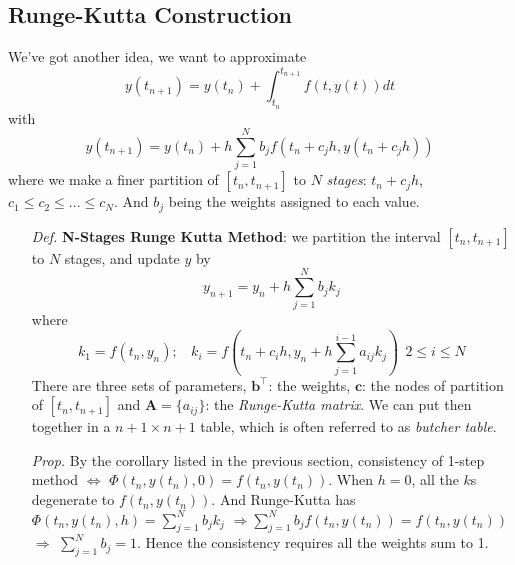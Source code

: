 \documentclass[a4paper, 11pt]{article}
\begin{document}
\subsection{Runge-Kutta Construction}
We've got another idea, we want to approximate
$$
y(t_{n+1}) = y(t_n) + \int_{t_n}^{t_{n+1}} f(t, y(t)) dt
$$
with 
$$
y(t_{n+1}) = y(t_n) + h \sum_{j=1}^N b_j f(t_n + c_jh, y(t_n + c_j h))
$$
where we make a finer partition of $[t_n, t_{n+1}]$ to $N$ \emph{stages}: $t_n + c_j h$, $c_1 \leq c_2 \leq ... \leq c_N$. And $b_j$ being the weights assigned to each value.
\begin{itemize}
	\item[\textit{Def.}] \textbf{N-Stages Runge Kutta Method}: we partition the interval $[t_n, t_{n+1}]$ to $N$ stages, and update $y$ by
	$$
	y_{n+1} = y_n + h\sum_{j=1}^N b_j k_j
	$$
	where
	$$
	k_1 = f(t_n, y_n);~~~~k_i=f(t_n+c_ih, y_n + h\sum_{j=1}^{i-1} a_{ij}k_j)~~2\leq i \leq N
	$$
	There are three sets of parameters, $\bm{b}^{\top}$: the weights, $\bm{c}$: the nodes of partition of $[t_n, t_{n+1}]$ and $\bm{A}=\{a_{ij}\}$: the \emph{Runge-Kutta matrix}. We can put then together in a $n+1 \times n+1$ table, which is often referred to as \emph{butcher table}.
		

	\item[\textit{Prop.}] By the corollary listed in the previous section, consistency of 1-step method $\iff$ $\Phi(t_n, y(t_n), 0)=f(t_n,y(t_n))$. When $h=0$, all the $k$s degenerate to $f(t_n, y(t_n))$. And Runge-Kutta has $\Phi(t_n,y(t_n),h)=\sum_{j=1}^N b_j k_j$ $\Rightarrow \sum_{j=1}^N b_j f(t_n, y(t_n))= f(t_n, y(t_n))$ $\Rightarrow$ $\sum_{j=1}^N b_j=1$. Hence the consistency requires all the weights sum to 1.


\end{itemize}
\end{document}
